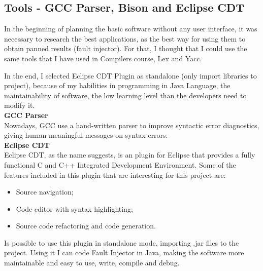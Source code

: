 \clearpage
\subsection{Tools - GCC Parser, Bison and Eclipse CDT}

In the beginning of planning the basic software without any user interface, it was necessary to research the best applications, as the best way for using them to obtain panned results (fault injector).
For that, I thought that I could use the same tools that I have used in Compilers course, Lex and Yacc.


In the end, I selected Eclipse CDT Plugin as standalone (only import libraries to project), because of my habilities in programming in Java Language, the maintainability of software, the low learning level than the developers need to modify it.\\

\textbf{GCC Parser}\\

Nowadays, GCC use a hand-written parser to improve syntactic error diagnostics, giving human meaningful messages on syntax errors.\\

\textbf{Eclipse CDT}\\

Eclipse CDT, as the name suggests, is an plugin for Eclipse that provides a fully functional C and C++ Integrated Development Environment.
Some of the features included in this plugin that are interesting for this project are:
\begin{itemize}
	\item Source navigation;
	\item Code editor with syntax highlighting;
	\item Source code refactoring and code generation.
\end{itemize}

Is possible to use this plugin in standalone mode, importing .jar files to the project.
Using it I can code Fault Injector in Java, making the software more maintainable and easy to use, write, compile and debug.
\\




